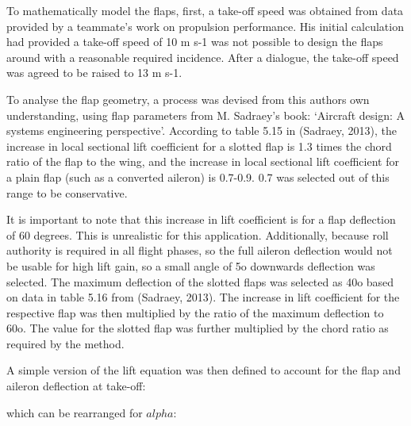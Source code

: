 \documentclass[../../main.tex]{subfiles}
\begin{document}
To mathematically model the flaps, first, a take-off speed was obtained from data provided by a teammate’s work on propulsion performance.
His initial calculation had provided a take-off speed of 10 m s-1 was not possible to design the flaps around with a reasonable required incidence.
After a dialogue, the take-off speed was agreed to be raised to 13 m s-1. 

To analyse the flap geometry, a process was devised from this authors own understanding, using flap parameters from M.
Sadraey’s book: ‘Aircraft design: A systems engineering perspective’.
According to table 5.15 in (Sadraey, 2013), the increase in local sectional lift coefficient for a slotted flap is 1.3 times the chord ratio of the flap to the wing, and the increase in local sectional lift coefficient for a plain flap (such as a converted aileron) is 0.7-0.9. 0.7 was selected out of this range to be conservative. 

It is important to note that this increase in lift coefficient is for a flap deflection of 60 degrees.
This is unrealistic for this application.
Additionally, because roll authority is required in all flight phases, so the full aileron deflection would not be usable for high lift gain, so a small angle of 5o downwards deflection was selected.
The maximum deflection of the slotted flaps was selected as 40o based on data in table 5.16 from (Sadraey, 2013).
The increase in lift coefficient for the respective flap was then multiplied by the ratio of the maximum deflection to 60o.
The value for the slotted flap was further multiplied by the chord ratio as required by the method. 

A simple version of the lift equation was then defined to account for the flap and aileron deflection at take-off: 


which can be rearranged for $alpha$:
\end{document}
